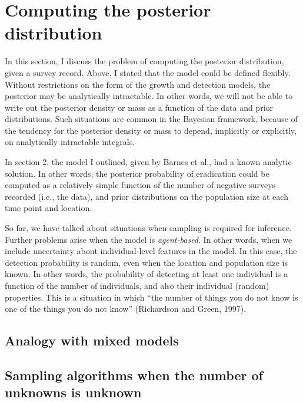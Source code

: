 \documentclass[
]{book}
\begin{document}
\hypertarget{computing-the-posterior-distribution}{%
\section{Computing the posterior distribution}\label{computing-the-posterior-distribution}}

In this section, I discuss the problem of computing the posterior distribution, given a survey record. Above, I stated that the model could be defined flexibly. Without restrictions on the form of the growth and detection models, the posterior may be analytically intractable. In other words, we will not be able to write out the posterior density or mass as a function of the data and prior distributions. Such situations are common in the Bayesian framework, because of the tendency for the posterior density or mass to depend, implicitly or explicitly, on analytically intractable integrals.

In section 2, the model I outlined, given by Barnes et al., had a known analytic solution. In other words, the posterior probability of eradication could be computed as a relatively simple function of the number of negative surveys recorded (i.e., the data), and prior distributions on the population size at each time point and location.

So far, we have talked about situations when sampling is required for inference. Further problems arise when the model is \emph{agent-based}. In other words, when we include uncertainty about individual-level features in the model. In this case, the detection probability is random, even when the location and population size is known. In other words, the probability of detecting at least one individual is a function of the number of individuals, and also their individual (random) properties. This is a situation in which ``the number of things you do not know is one of the things you do not know'' (Richardson and Green, 1997).

\hypertarget{analogy-with-mixed-models}{%
\subsection{Analogy with mixed models}\label{analogy-with-mixed-models}}

\hypertarget{sampling-algorithms-when-the-number-of-unknowns-is-unknown}{%
\subsection{Sampling algorithms when the number of unknowns is unknown}\label{sampling-algorithms-when-the-number-of-unknowns-is-unknown}}
\end{document}
